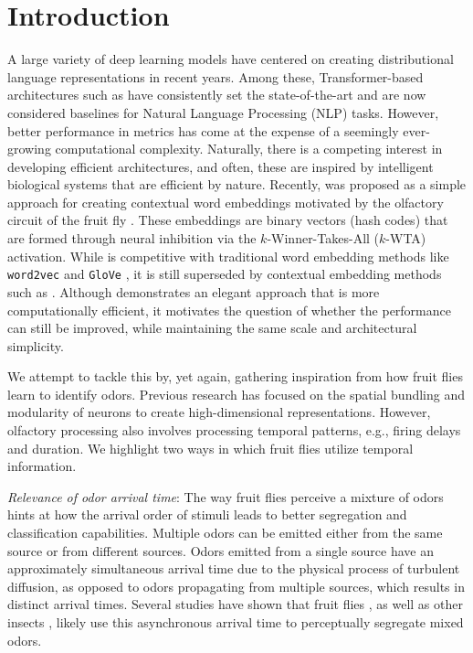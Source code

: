 \section{Introduction}\label{sec:introduction}
A large variety of deep learning models have centered on creating distributional language representations in recent years.
Among these, Transformer-based architectures such as \bert \cite{bert} have consistently set the state-of-the-art and are now considered baselines for Natural Language Processing (NLP) tasks.
However, better performance in metrics has come at the expense of a seemingly ever-growing computational complexity.
Naturally, there is a competing interest in developing efficient architectures, and often, these are inspired by intelligent biological systems that are efficient by nature.
Recently, \flyvec was proposed as a simple approach for creating contextual word embeddings motivated by the olfactory circuit of the fruit fly \cite{flyvec}.
These embeddings are binary vectors (hash codes) that are formed through neural inhibition via the $k$-Winner-Takes-All ($k$-WTA) activation.
While \flyvec is competitive with traditional word embedding methods like \texttt{word2vec} \cite{word2vec} and \texttt{GloVe} \cite{glove}, it is still superseded by contextual embedding methods such as \bert \cite{bert}.
Although \flyvec demonstrates an elegant approach that is more computationally efficient, it motivates the question of whether the performance can still be improved, while maintaining the same scale and architectural simplicity.

\par
We attempt to tackle this by, yet again, gathering inspiration from how fruit flies learn to identify odors.
Previous research has focused on the spatial bundling and modularity of neurons to create high-dimensional representations.
However, olfactory processing also involves processing temporal patterns, e.g., firing delays and duration. 
We highlight two ways in which fruit flies utilize temporal information.

\par
\textit{Relevance of odor arrival time}: 
The way fruit flies perceive a mixture of odors hints at how the arrival order of stimuli leads to better segregation and classification capabilities.
Multiple odors can be emitted either from the same source or from different sources.
Odors emitted from a single source have an approximately simultaneous arrival time due to the physical process of turbulent diffusion, as opposed to odors propagating from multiple sources, which results in distinct arrival times.
Several studies have shown that fruit flies \cite{10.1371/journal.pone.0036096, hopfield1991olfactory, SEHDEV2019113}, as well as other insects \cite{baker1998moth, saha2013spatiotemporal, nikonov2002peripheral, witzgall1991wind, andersson2011attraction}, likely use this asynchronous arrival time to perceptually segregate mixed odors.

